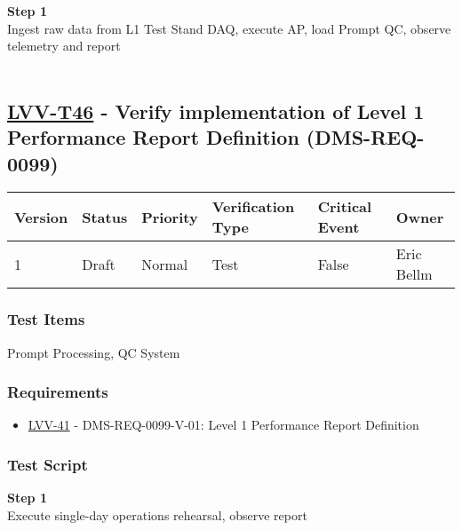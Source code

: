 \textbf{Step 1}\\
Ingest raw data from L1 Test Stand DAQ, execute AP, load Prompt QC,
observe telemetry and report\\
~\\

\hypertarget{lvv-t46---verify-implementation-of-level-1-performance-report-definition-dms-req-0099}{%
\subsection{\texorpdfstring{\href{https://jira.lsstcorp.org/secure/Tests.jspa\#/testCase/LVV-T46}{LVV-T46}
- Verify implementation of Level 1 Performance Report Definition
(DMS-REQ-0099)}{LVV-T46 - Verify implementation of Level 1 Performance Report Definition (DMS-REQ-0099)}}\label{lvv-t46---verify-implementation-of-level-1-performance-report-definition-dms-req-0099}}

\begin{longtable}[]{@{}llllll@{}}
\toprule
Version & Status & Priority & Verification Type & Critical Event &
Owner\tabularnewline
\midrule
\endhead
1 & Draft & Normal & Test & False & Eric Bellm\tabularnewline
\bottomrule
\end{longtable}

\hypertarget{test-items-22}{%
\subsubsection{Test Items}\label{test-items-22}}

Prompt Processing, QC System~

\hypertarget{requirements-23}{%
\subsubsection{Requirements}\label{requirements-23}}

\begin{itemize}
\tightlist
\item
  \href{https://jira.lsstcorp.org/browse/LVV-41}{LVV-41} -
  DMS-REQ-0099-V-01: Level 1 Performance Report Definition
\end{itemize}

\hypertarget{test-script-23}{%
\subsubsection{Test Script}\label{test-script-23}}

\textbf{Step 1}\\
Execute single-day operations rehearsal, observe report\\
~\\

